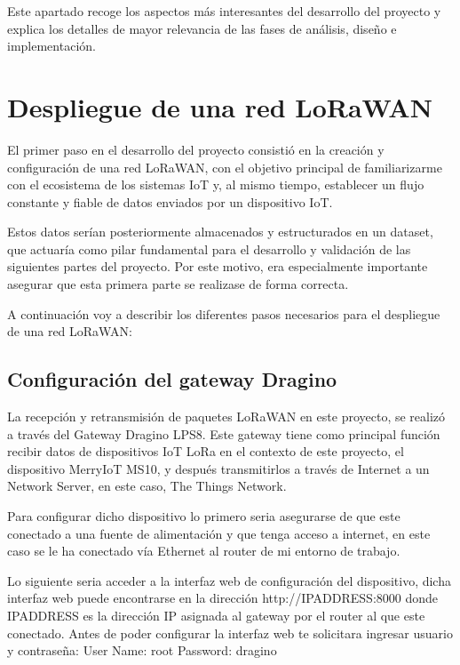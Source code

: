 
Este apartado recoge los aspectos más interesantes del desarrollo del proyecto y explica los detalles de mayor relevancia de las fases de análisis, diseño e implementación.

\section{Despliegue de una red LoRaWAN}
El primer paso en el desarrollo del proyecto consistió en la creación y configuración de una red LoRaWAN, con el objetivo principal de familiarizarme con el ecosistema de los sistemas IoT y, al mismo tiempo, establecer un flujo constante y fiable de datos enviados por un dispositivo IoT.

Estos datos serían posteriormente almacenados y estructurados en un dataset, que actuaría como pilar fundamental para el desarrollo y validación de las siguientes partes del proyecto. Por este motivo, era especialmente importante asegurar que esta primera parte se realizase de forma correcta.

A continuación voy a describir los diferentes pasos necesarios para el despliegue de una red LoRaWAN:

\subsection{Configuración del gateway Dragino}
La recepción y retransmisión de paquetes LoRaWAN en este proyecto, se realizó a través del Gateway Dragino LPS8. Este gateway tiene como principal función recibir datos de dispositivos IoT LoRa en el contexto de este proyecto, el dispositivo MerryIoT MS10, y después transmitirlos a través de Internet a un Network Server, en este caso, The Things Network.

Para configurar dicho dispositivo lo primero seria asegurarse de que este conectado a una fuente de alimentación y que tenga acceso a internet, en este caso se le ha conectado vía Ethernet al router de mi entorno de trabajo.

Lo siguiente seria acceder a la interfaz web de configuración del dispositivo, dicha interfaz web puede encontrarse en la dirección http://IPADDRESS:8000 donde IPADDRESS es la dirección IP asignada al gateway por el router al que este conectado. Antes de poder configurar la interfaz web te solicitara ingresar usuario y contraseña:
User Name: root
Password: dragino

